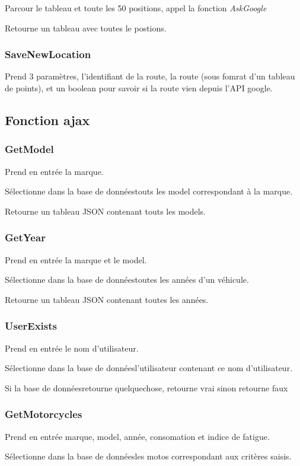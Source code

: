 \documentclass[a4paper]{article}
\newcommand{\bdd}{base de données}
\begin{document}
Parcour le tableau et toute les 50 positions, appel la fonction \emph{AskGoogle}

Retourne un tableau avec toutes le postions.

\subsubsection{SaveNewLocation}
Prend 3 paramètres, l'identifiant de la route, la route (sous fomrat d'un tableau de points), et un boolean pour savoir si la route vien depuis l'API google.






\subsection{Fonction ajax}
\subsubsection{GetModel}
Prend en entrée la marque.

Sélectionne dans la \bdd touts les model correspondant à la marque.

Retourne un tableau JSON contenant touts les models.

\subsubsection{GetYear}	
Prend en entrée la marque et le model.

Sélectionne dans la \bdd toutes les années d'un véhicule.

Retourne un tableau JSON contenant toutes les années.

\subsubsection{UserExists}
Prend en entrée le nom d'utilisateur.

Sélectionne dans la \bdd l'utilisateur contenant ce nom d'utilisateur.

Si la \bdd retourne quelquechose, retourne vrai sinon retourne faux


\subsubsection{GetMotorcycles}
Prend en entrée marque, model, année, consomation et indice de fatigue.

Sélectionne dans la \bdd les motos correspondant aux critères saisis.
\end{document}
